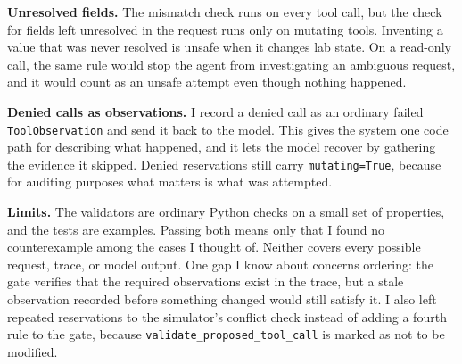 \documentclass[11pt,letterpaper]{article}
\begin{document}
\textbf{Unresolved fields.} The mismatch check runs on every tool call, but the check for fields left unresolved in the
request runs only on mutating tools. Inventing a value that was never resolved is unsafe when it
changes lab state. On a read-only call, the same rule would stop the agent from investigating an
ambiguous request, and it would count as an unsafe attempt even though nothing happened.

\textbf{Denied calls as observations.} I record a denied call as an ordinary failed \texttt{ToolObservation} and send it back to the
model. This gives the system one code path for describing what happened, and it lets the model
recover by gathering the evidence it skipped. Denied reservations still carry
\texttt{mutating=True}, because for auditing purposes what matters is what was attempted.

\textbf{Limits.} The validators are ordinary Python checks on a small set of properties, and the tests are
examples. Passing both means only that I found no counterexample among the cases I thought of.
Neither covers every possible request, trace, or model output. One gap I know about concerns
ordering: the gate verifies that the required observations exist in the trace, but a stale
observation recorded before something changed would still satisfy it. I also left repeated
reservations to the simulator's conflict check instead of adding a fourth rule to the gate,
because \texttt{validate\_proposed\_tool\_call} is marked as not to be modified.
\end{document}

